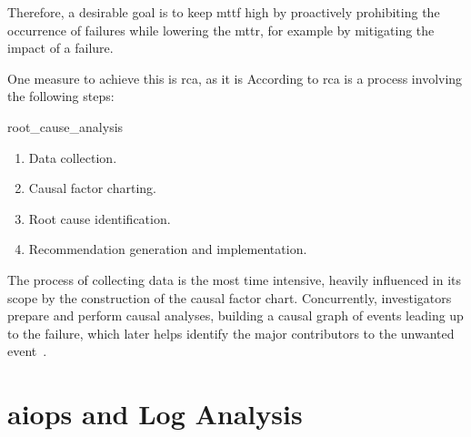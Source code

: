 Therefore, a desirable goal is to keep \ac{mttf} high by proactively prohibiting the occurrence of failures
while lowering the \ac{mttr}, for example by mitigating the impact of a failure.

One measure to achieve this is \ac{rca},
as it is 
According to \citeauthor*{root_cause_analysis} \ac{rca} is a process involving the following steps:
\begin{displaycquote}[46-48]{root_cause_analysis}
\begin{enumerate}
\item Data collection.
\item Causal factor charting.
\item Root cause identification.
\item Recommendation generation and implementation.
\end{enumerate}
\end{displaycquote}
The process of collecting data is the most time intensive,
heavily influenced in its scope by the construction of the causal factor chart.
Concurrently, investigators prepare and perform causal analyses,
building a causal graph of events leading up to the failure,
which later helps identify the major contributors to the unwanted event~\parencite[48]{root_cause_analysis}.

\section{\Acl*{aiops} and Log Analysis}


%

